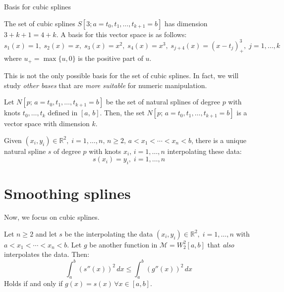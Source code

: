 \begin{example}{Basis for cubic splines}{}

    The set of cubic splines $S[3;a=t_0,t_1,\ldots,t_{k+1}=b]$ has dimension
    $3+k+1 = 4+k$. A basis for this vector space is as follows:
    \begin{equation*}
        s_1(x) = 1,\; s_2(x) = x,\; s_3(x) = x^2,\; s_4(x) = x^3,\;
        s_{j+4}(x) = (x - t_j)^3_+,\; j=1,\ldots,k
    \end{equation*}
    where $u_+ = \max\{u,0\}$ is the positive part of $u$.
    \tcblower
    \begin{note}
        This is not the only possible basis for the set of cubic splines.
        In fact, we will study \emph{other bases} that are \emph{more suitable} for numeric manipulation.
    \end{note}
\end{example}

\begin{prop}{}{}
    Let $N[p;\,a=t_0,t_1,\ldots,t_{k+1}=b]$ be the set of natural splines of degree $p$
    with knots $t_0,\ldots,t_{k}$ defined in $[a,\,b]$. Then, the set $N[p;\,a=t_0,t_1,\ldots,t_{k+1}=b]$
    is a vector space with dimension $k$.
\end{prop}

\begin{prop}{}{}
    Given $(x_i,y_i)\in\mathds R^2,\;i=1,\ldots,n,\,n\geq 2,\,
    a < x_1 < \cdots < x_n < b$, there is a unique natural spline $s$
    of degree $p$ with knots $x_i,\,i=1,\ldots,n$ interpolating these
    data:
    \begin{equation*}
        s(x_i) = y_i,\;i=1,\ldots,n
    \end{equation*}
\end{prop}

\pagebreak
\section{Smoothing splines}

Now, we focus on cubic splines.

\begin{prop}{}{}
    Let $n\geq 2$ and let $s$ be the  interpolating the
    data $(x_i,y_i)\in\mathds R^2,\;i=1,\ldots,n$ with $a < x_1 < \cdots < x_n < b$.
    Let $g$ be another function in $\mathcal M = W_2^2[a,b]$ that \emph{also}
    interpolates the data. Then:
    \begin{equation*}
        \int_a^b \left(s''(x)\right)^2\,dx \leq \int_a^b \left(g''(x)\right)^2\,dx
    \end{equation*}
    Holds if and only if $g(x) = s(x)\, \forall x \in [a,b]$.
\end{prop}

